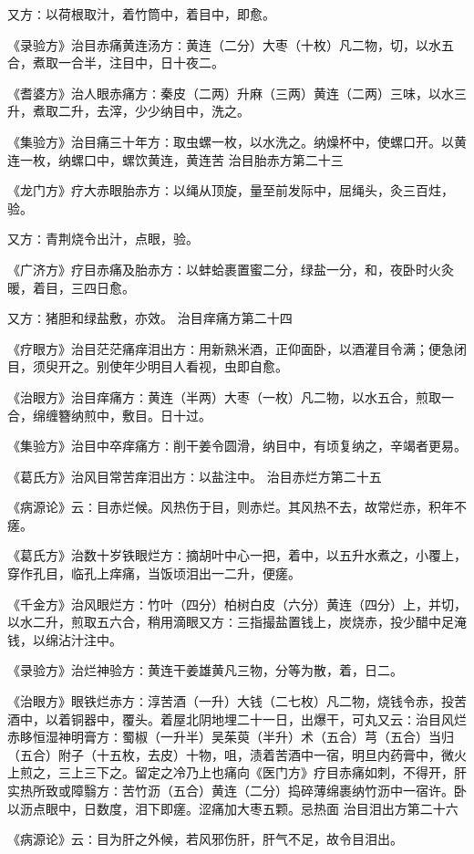 \documentclass[a4paper,12pt,UTF8,twoside]{ctexbook}
\begin{document}
又方∶以荷根取汁，着竹筒中，着目中，即愈。

《录验方》治目赤痛黄连汤方∶黄连（二分）大枣（十枚）凡二物，切，以水五合，煮取一合半，注目中，日十夜二。

《耆婆方》治人眼赤痛方∶秦皮（二两）升麻（三两）黄连（二两）三味，以水三升，煮取二升，去滓，少少纳目中，洗之。

《集验方》治目痛三十年方∶取虫螺一枚，以水洗之。纳燥杯中，使螺口开。以黄连一枚，纳螺口中，螺饮黄连，黄连苦
治目胎赤方第二十三

《龙门方》疗大赤眼胎赤方∶以绳从顶旋，量至前发际中，屈绳头，灸三百炷，验。

又方∶青荆烧令出汁，点眼，验。

《广济方》疗目赤痛及胎赤方∶以蚌蛤裹置蜜二分，绿盐一分，和，夜卧时火灸暖，着目，三四日愈。

又方∶猪胆和绿盐敷，亦效。
治目痒痛方第二十四

《疗眼方》治目茫茫痛痒泪出方∶用新熟米酒，正仰面卧，以酒灌目令满；便急闭目，须臾开之。别使年少明目人看视，虫即自愈。

《治眼方》治目痒痛方∶黄连（半两）大枣（一枚）凡二物，以水五合，煎取一合，绵缠簪纳煎中，敷目。日十过。

《集验方》治目中卒痒痛方∶削干姜令圆滑，纳目中，有顷复纳之，辛竭者更易。

《葛氏方》治风目常苦痒泪出方∶以盐注中。
治目赤烂方第二十五

《病源论》云∶目赤烂候。风热伤于目，则赤烂。其风热不去，故常烂赤，积年不瘥。

《葛氏方》治数十岁铁眼烂方∶摘胡叶中心一把，着中，以五升水煮之，小覆上，穿作孔目，临孔上痒痛，当饭顷泪出一二升，便瘥。

《千金方》治风眼烂方∶竹叶（四分）柏树白皮（六分）黄连（四分）上，并切，以水二升，煎取五六合，稍用滴眼又方∶三指撮盐置钱上，炭烧赤，投少醋中足淹钱，以绵沾汁注中。

《录验方》治烂神验方∶黄连干姜雄黄凡三物，分等为散，着，日二。

《治眼方》眼铁烂赤方∶淳苦酒（一升）大钱（二七枚）凡二物，烧钱令赤，投苦酒中，以着铜器中，覆头。着屋北阴地埋二十一日，出爆干，可丸又云∶治目风烂赤眵恒湿神明膏方∶蜀椒（一升半）吴茱萸（半升）术（五合）芎（五合）当归（五合）附子（十五枚，去皮）十物，咀，渍着苦酒中一宿，明旦内药膏中，微火上煎之，三上三下之。留定之冷乃上也痛向《医门方》疗目赤痛如刺，不得开，肝实热所致或障翳方∶苦竹沥（五合）黄连（二分）捣碎薄绵裹纳竹沥中一宿许。卧以沥点眼中，日数度，泪下即瘥。涩痛加大枣五颗。忌热面
治目泪出方第二十六

《病源论》云∶目为肝之外候，若风邪伤肝，肝气不足，故令目泪出。
\end{document}
